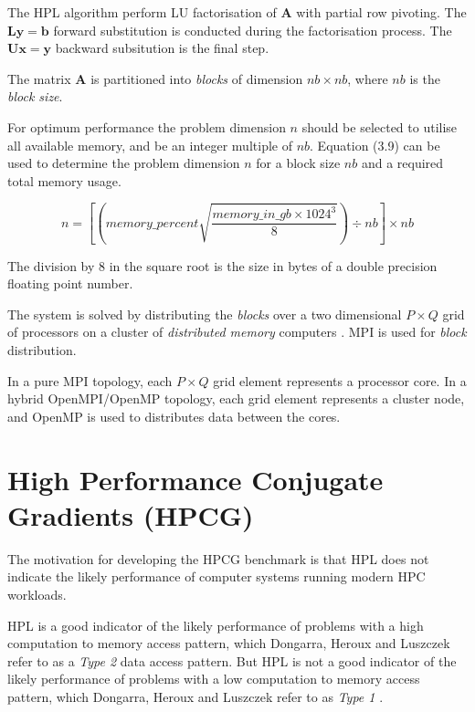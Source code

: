 The HPL algorithm \cite{hpl-algorithm} perform LU factorisation of $\mathbf{A}$ with partial row pivoting. The $\mathbf{L}\mathbf{y}=\mathbf{b}$ forward substitution is conducted during the factorisation process. The $\mathbf{U}\mathbf{x}=\mathbf{y}$ backward subsitution is the final step. 

The matrix $\mathbf{A}$ is partitioned into \emph{blocks} of dimension $nb \times nb$, where $nb$ is the \emph{block size}.

For optimum performance the problem dimension $n$ should be selected to utilise all available memory, and be an integer multiple of $nb$. Equation (3.9) can be used to determine the problem dimension $n$ for a block size $nb$ and a required total memory usage.

\begin{equation}
n = \left[\left(memory\_percent \sqrt{\frac{memory\_in\_gb \times 1024^3}{8}}\right) \div nb\right] \times nb
\end{equation}

The division by 8 in the square root is the size in bytes of a double precision floating point number.

The system is solved by distributing the \emph{blocks} over a two dimensional $P \times Q$ grid of processors on a cluster of \emph{distributed memory} computers \cite{linpack-ppf}. MPI is used for \emph{block} distribution.

In a pure MPI topology, each $P \times Q$ grid element represents a processor core. In a hybrid OpenMPI/OpenMP topology, each grid element represents a cluster node, and OpenMP is used to distributes data between the cores.   





%
%
\section{High Performance Conjugate Gradients (HPCG)}

The motivation for developing the HPCG benchmark \cite{hpcg-benchmark} is that HPL does not indicate the likely performance of computer systems running modern HPC workloads.

HPL is a good indicator of the likely performance of problems with a high computation to memory access pattern, which Dongarra, Heroux and Luszczek refer to as a \emph{Type 2} \cite{hpcg-benchmark} data access pattern. But HPL is not a good indicator of the likely performance of problems with a low computation to memory access pattern, which Dongarra, Heroux and Luszczek refer to as \emph{Type 1} \cite{hpcg-benchmark}.

